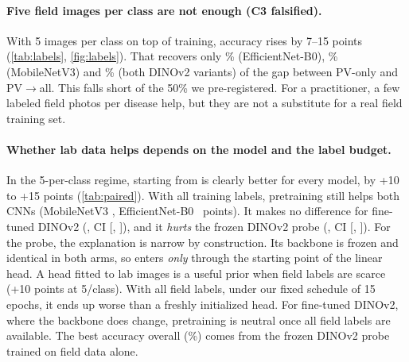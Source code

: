 \paragraph{Five field images per class are not enough (C3 falsified).}
With 5 \PD images per class on top of \PV training, accuracy rises by 7--15 points (\cref{tab:labels}, \cref{fig:labels}). That recovers only \effbzeroRec\% (EfficientNet-B0), \mnvthreeRec\% (MobileNetV3) and \dinovtwoslpRec\% (both DINOv2 variants) of the gap between PV-only and PV$\rightarrow$all. This falls short of the 50\% we pre-registered.
For a practitioner, a few labeled field photos per disease help, but they are not a substitute for a real field training set.

\paragraph{Whether lab data helps depends on the model and the label budget.}
In the 5-per-class regime, starting from \PV is clearly better for every model, by +10 to +15 points (\cref{tab:paired}).
With all \PD training labels, \PV pretraining still helps both CNNs (MobileNetV3 \PCe, EfficientNet-B0 \PCg\ points). It makes no difference for fine-tuned DINOv2 (\PCk, CI [\PCklo, \PCkhi]), and it \emph{hurts} the frozen DINOv2 probe (\PCi, CI [\PCilo, \PCihi]).
For the probe, the explanation is narrow by construction. Its backbone is frozen and identical in both arms, so \PV enters \emph{only} through the starting point of the linear head. A head fitted to lab images is a useful prior when field labels are scarce (+10 points at 5/class). With all field labels, under our fixed schedule of 15 epochs, it ends up worse than a freshly initialized head.
For fine-tuned DINOv2, where the backbone does change, \PV pretraining is neutral once all field labels are available.
The best \PD accuracy overall (\dinovtwoslppdallpre\%) comes from the frozen DINOv2 probe trained on field data alone.

\begin{table}[t]
\centering\scriptsize\setlength{\tabcolsep}{2pt}
\resizebox{\linewidth}{!}{}
\caption{\textbf{Paired comparisons} on \PD test (seed-averaged top-1 difference in points, A$-$B; 95\% paired bootstrap CI over test images, 5{,}000 resamples, no multiple-comparison correction). LP/FT = DINOv2 linear probe / fine-tune.}
\label{tab:paired}
\end{table}

